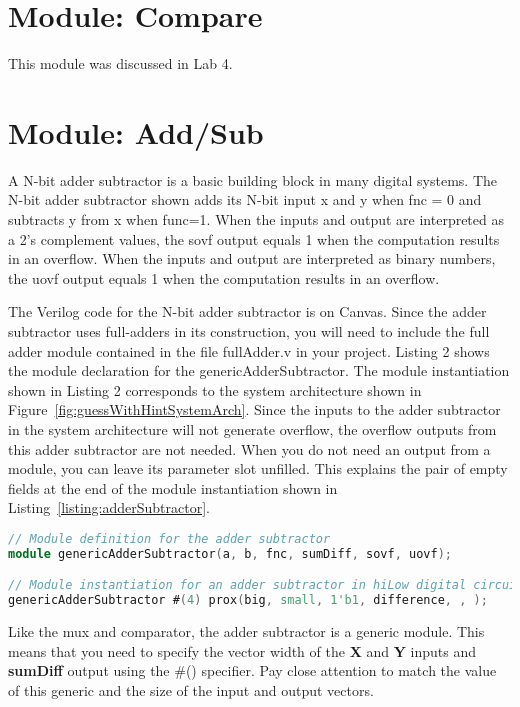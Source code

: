\section{Module: Compare}
This module was discussed in Lab 4.

\section{Module: Add/Sub }

A N-bit adder subtractor is a basic building block in many digital
systems. The N-bit adder subtractor shown adds its N-bit
input x and y when fnc = 0 and subtracts y from x when func=1. When
the inputs and output are interpreted as a 2's complement values, the
sovf output equals 1 when the computation results in an overflow. When
the inputs and output are interpreted as binary numbers, the uovf output
equals 1 when the computation results in an overflow.

The Verilog code for the N-bit adder subtractor is on Canvas. Since the 
adder subtractor uses full-adders in its construction, you will need to
include the full adder module contained in the file fullAdder.v in your
project. Listing 2 shows the module declaration for the genericAdderSubtractor. 
 The module
instantiation shown in Listing 2 corresponds to the system architecture
shown in Figure~\ref{fig:guessWithHintSystemArch}. Since the inputs to the adder subtractor in the
system architecture will not generate overflow, the overflow outputs
from this adder subtractor are not needed. When you do not need an
output from a module, you can leave its parameter slot unfilled. This
explains the pair of empty fields at the end of the module instantiation
shown in Listing~\ref{listing:adderSubtractor}.

\begin{lstlisting}[language=Verilog,
 caption={Top, module definition for an adder subtractor.  Bottom, module instantation 
 of the adder subtractor in Figure~\ref{fig:guessWithHintSystemArch}.},
 label={listing:adderSubtractor},
 frame=single]
// Module definition for the adder subtractor
module genericAdderSubtractor(a, b, fnc, sumDiff, sovf, uovf);

// Module instantiation for an adder subtractor in hiLow digital circuit
genericAdderSubtractor #(4) prox(big, small, 1'b1, difference, , );
\end{lstlisting}


Like the mux and comparator, the adder subtractor is a generic module.
This means that you need to specify the vector width of the \textbf{X}
and \textbf{Y} inputs and \textbf{sumDiff} output using the \#()
specifier. Pay close attention to match the value of this generic and
the size of the input and output vectors.


